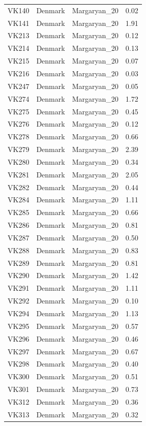 \begin{longtable}[t]{lllr}
VK140 & Denmark & Margaryan\_20 & 0.02\\
VK141 & Denmark & Margaryan\_20 & 1.91\\
VK213 & Denmark & Margaryan\_20 & 0.12\\
VK214 & Denmark & Margaryan\_20 & 0.13\\
VK215 & Denmark & Margaryan\_20 & 0.07\\
VK216 & Denmark & Margaryan\_20 & 0.03\\
VK247 & Denmark & Margaryan\_20 & 0.05\\
VK274 & Denmark & Margaryan\_20 & 1.72\\
VK275 & Denmark & Margaryan\_20 & 0.45\\
VK276 & Denmark & Margaryan\_20 & 0.12\\
VK278 & Denmark & Margaryan\_20 & 0.66\\
VK279 & Denmark & Margaryan\_20 & 2.39\\
VK280 & Denmark & Margaryan\_20 & 0.34\\
VK281 & Denmark & Margaryan\_20 & 2.05\\
VK282 & Denmark & Margaryan\_20 & 0.44\\
VK284 & Denmark & Margaryan\_20 & 1.11\\
VK285 & Denmark & Margaryan\_20 & 0.66\\
VK286 & Denmark & Margaryan\_20 & 0.81\\
VK287 & Denmark & Margaryan\_20 & 0.50\\
VK288 & Denmark & Margaryan\_20 & 0.83\\
VK289 & Denmark & Margaryan\_20 & 0.81\\
VK290 & Denmark & Margaryan\_20 & 1.42\\
VK291 & Denmark & Margaryan\_20 & 1.11\\
VK292 & Denmark & Margaryan\_20 & 0.10\\
VK294 & Denmark & Margaryan\_20 & 1.13\\
VK295 & Denmark & Margaryan\_20 & 0.57\\
VK296 & Denmark & Margaryan\_20 & 0.46\\
VK297 & Denmark & Margaryan\_20 & 0.67\\
VK298 & Denmark & Margaryan\_20 & 0.40\\
VK300 & Denmark & Margaryan\_20 & 0.51\\
VK301 & Denmark & Margaryan\_20 & 0.73\\
VK312 & Denmark & Margaryan\_20 & 0.36\\
VK313 & Denmark & Margaryan\_20 & 0.32\\

\end{longtable}
